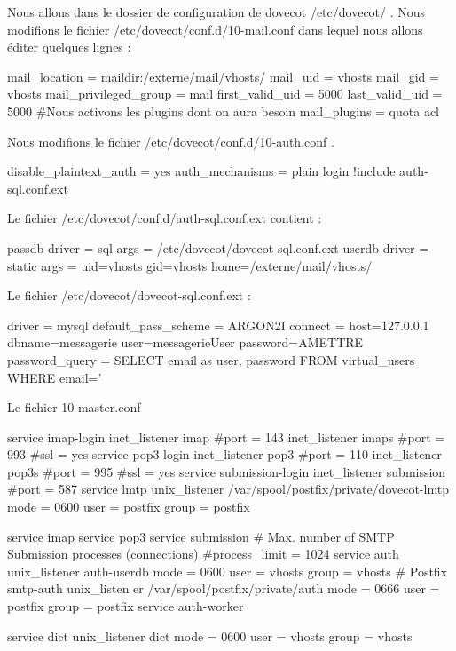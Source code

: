 \documentclass[a4paper,12pt,french]{report} %
\begin{document}
Nous allons dans le dossier de configuration de dovecot /etc/dovecot/ .
Nous modifions le fichier /etc/dovecot/conf.d/10-mail.conf dans lequel nous allons éditer quelques lignes :
\begin{exempleConsole}
mail_location = maildir:/externe/mail/vhosts/%
mail_uid = vhosts
mail_gid = vhosts
mail_privileged_group = mail
first_valid_uid = 5000
last_valid_uid = 5000
#Nous activons les plugins dont on aura besoin
mail_plugins = quota acl 
\end{exempleConsole}

Nous modifions le fichier /etc/dovecot/conf.d/10-auth.conf .
\begin{exempleConsole}
disable_plaintext_auth = yes
auth_mechanisms = plain login
!include auth-sql.conf.ext
\end{exempleConsole}

Le fichier /etc/dovecot/conf.d/auth-sql.conf.ext contient :
\begin{exempleConsole}
passdb {
  driver = sql
  args = /etc/dovecot/dovecot-sql.conf.ext
}
userdb {
  driver = static
  args = uid=vhosts gid=vhosts home=/externe/mail/vhosts/%
}
\end{exempleConsole}

Le fichier /etc/dovecot/dovecot-sql.conf.ext :
\begin{exempleConsole}
driver = mysql 
default_pass_scheme = ARGON2I
connect = host=127.0.0.1 dbname=messagerie user=messagerieUser password=AMETTRE
password_query = SELECT email as user, password FROM virtual_users WHERE email='%
\end{exempleConsole}

Le fichier 10-master.conf
\begin{exempleConsole}
service imap-login {
  inet_listener imap {
    #port = 143
  }
  inet_listener imaps {
    #port = 993
    #ssl = yes
  }
}
service pop3-login {
  inet_listener pop3 {
    #port = 110
  }
  inet_listener pop3s {
    #port = 995
    #ssl = yes
  }
}
service submission-login {
  inet_listener submission {
    #port = 587
  }
}
service lmtp {
    unix_listener /var/spool/postfix/private/dovecot-lmtp {
    mode = 0600
    user = postfix
    group = postfix
  }
}

service imap {
}
service pop3 {  
}
service submission {
  # Max. number of SMTP Submission processes (connections)
  #process_limit = 1024
}
service auth {
  unix_listener auth-userdb {
    mode = 0600
    user = vhosts
    group = vhosts 
  }
  # Postfix smtp-auth
  unix_listen  er /var/spool/postfix/private/auth {
    mode = 0666
    user = postfix
    group = postfix 
}
}
service auth-worker {
  
}
service dict {
  unix_listener dict {
    mode = 0600
    user = vhosts
    group = vhosts
  }
}
\end{exempleConsole}
\end{document}
